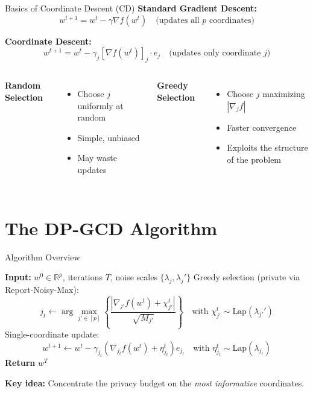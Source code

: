 \documentclass[10pt]{beamer}
\begin{document}
\begin{frame}{Basics of Coordinate Descent (CD)}
\textbf{Standard Gradient Descent:}
\[
w^{t+1} = w^t - \gamma \nabla f(w^t) \quad \text{(updates all $p$ coordinates)}
\]

\vspace{1em}
\textbf{Coordinate Descent:}
\[
w^{t+1} = w^t - \gamma_j [\nabla f(w^t)]_j \cdot e_j \quad \text{(updates only coordinate $j$)}
\]

\vspace{1em}
\begin{columns}[T]
\textbf{Random Selection}
\begin{itemize}
\item Choose $j$ uniformly at random
\item Simple, unbiased
\item May waste updates
\end{itemize}

\textbf{Greedy Selection}
\begin{itemize}
\item Choose $j$ maximizing $|\nabla_j f|$
\item Faster convergence
\item Exploits the structure of the problem
\end{itemize}
\end{columns}
\end{frame}

\section{The DP-GCD Algorithm}

\begin{frame}{Algorithm Overview}
\begin{algorithm}[H]
\caption{DP-GCD (Simplified)}
\footnotesize
\begin{algorithmic}[1]
\State \textbf{Input:} $w^0 \in \mathbb{R}^p$, iterations $T$, noise scales $\{\lambda_j, \lambda_j'\}$
    \State \alert{Greedy selection (private via Report-Noisy-Max):}
    \[j_t \leftarrow \arg\max_{j' \in [p]} \left\{ \frac{|\nabla_{j'} f(w^t) + \chi_{j'}^t|}{\sqrt{M_{j'}}} \right\} \quad \text{with } \chi_{j'}^t \sim \text{Lap}(\lambda_{j'}')\]
    \State \alert{Single-coordinate update:} 
    \[w^{t+1} \leftarrow w^t - \gamma_{j_t} (\nabla_{j_t} f(w^t) + \eta_{j_t}^t) e_{j_t} \quad \text{with } \eta_{j_t}^t \sim \text{Lap}(\lambda_{j_t})\]
\EndFor
\State \textbf{Return} $w^T$
\end{algorithmic}
\end{algorithm}

\vspace{0.5em}
\textbf{Key idea:} Concentrate the privacy budget on the \emph{most informative} coordinates.
\end{frame}
\end{document}

